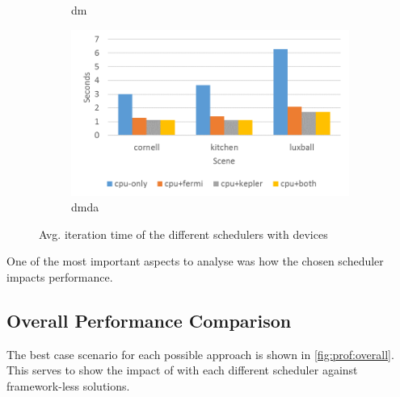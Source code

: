 \documentclass[main.tex]{subfiles}
\begin{document}
\begin{figure}[!htp]
\begin{subfigure}{.5\textwidth}
    \caption{dm \label{fig:prof:starpu_sched_dm}}
  \end{subfigure}%
  \begin{subfigure}{.5\textwidth}
    \centering
    \includegraphics[width=\linewidth]{profiling/starpu_sched_dmda}
    \caption{dmda \label{fig:prof:starpu_sched_dmda}}
  \end{subfigure}
  \caption{Avg. iteration time of the different schedulers with \gpu devices \label{fig:prof:starpu_scheds}}
\end{figure}

One of the most important aspects to analyse was how the chosen scheduler impacts performance.

\subsection{Overall Performance Comparison}

The best case scenario for each possible approach is shown in \cref{fig:prof:overall}. This serves to show the impact of \starpu with each different scheduler against framework-less solutions.
\end{document}

